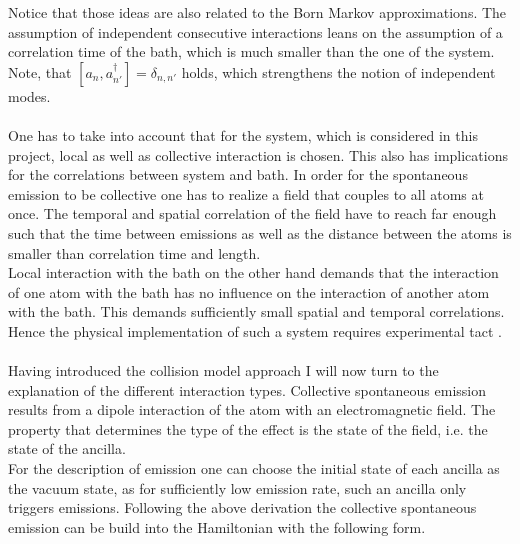 Notice that those ideas are also related to the Born Markov approximations. The assumption of independent consecutive interactions leans on the assumption of a correlation time of the bath, which is much smaller than the one of the system. Note, that $[a_n,a^\dagger_{n'}]=\delta_{n,n'}$ holds, which strengthens the notion of independent modes.\\\\%
One has to take into account that for the system, which is considered in this project, local as well as collective interaction is chosen. This also has implications for the correlations between system and bath.
In order for the spontaneous emission to be collective one has to realize a field that couples to all atoms at once. The temporal and spatial correlation of the field have to reach far enough such that the time between emissions as well as the distance between the atoms is smaller than correlation time and length. \\Local interaction with the bath on the other hand demands that the interaction of one atom with the bath has no influence on the interaction of another atom with the bath. This demands sufficiently small spatial and temporal correlations. Hence the physical implementation of such a system requires experimental tact \cite{diehl_quantum_2008,shaw_multi-ensemble_2024}.\\\\%
Having introduced the collision model approach I will now turn to the explanation of the different interaction types. Collective spontaneous emission results from a dipole interaction of the atom with an electromagnetic field. The property that determines the type of the effect is the state of the field, i.e. the state of the ancilla.\\
For the description of emission one can choose the initial state of each ancilla as the vacuum state, as for sufficiently low emission rate, such an ancilla only triggers emissions. Following the above derivation the collective spontaneous emission can be build into the Hamiltonian with the following form.
